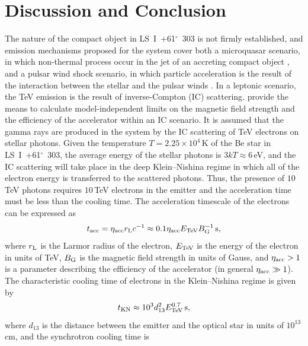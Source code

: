 \documentclass[preprint2]{aastex}
\newcommand{\tapp}{\raisebox{0.5ex}{\texttildelow}}
\newcommand{\lsi}{LS~I~+61$^{\circ}$~303}
\newcommand{\tev}{\,TeV}
\begin{document}
\section{Discussion and Conclusion}
The nature of the compact object in \lsi{} is not firmly established, and emission mechanisms proposed for the system cover both a microquasar scenario, in which non-thermal process occur in the jet of an accreting compact object \citep{Massi2001,Massi2013,2015A&A...575L...9M}, and a pulsar wind shock scenario, in which particle acceleration is the result of the interaction between the stellar and the pulsar winds \citep{Dhawan2006}. In a leptonic scenario, the TeV emission is the result of inverse-Compton (IC) scattering. \citet{2008MNRAS.383..467K} provide the means to calculate model-independent limits on the magnetic field strength and the efficiency of the accelerator within an IC scenario. It is assumed that the gamma rays are produced in the system by the IC scattering of TeV electrons on stellar photons. Given the temperature $T=2.25\times10^4$\,K \citep{2013A&ARv..21...64D} of the Be star in \lsi{}, the average energy of the stellar photons is $3kT \approx 6$\,eV, and the IC scattering will take place in the deep Klein--Nishina regime in which all of the electron energy is transferred to the scattered photons. Thus, the presence of \tapp{}$10$\tev{} photons requires \tapp{}$10$\tev{} electrons in the emitter and the acceleration time must be less than the cooling time. The acceleration timescale of the electrons can be expressed as
\begin{equation}
t_{\mbox{\scriptsize{acc}}} = \eta_{\mbox{\scriptsize{acc}}} r_{\mbox{\scriptsize{L}}} c^{-1} \approx 0.1 \eta_{\mbox{\scriptsize{acc}}} E_{\mbox{\scriptsize{TeV}}} B_{\mbox{\scriptsize{G}}}^{-1} \mbox{\,s},
\label{taccel}
\end{equation}
where $r_{\mbox{\scriptsize{L}}}$ is the Larmor radius of the electron, $E_{\mbox{\scriptsize{TeV}}}$ is the energy of the electron in units of TeV, $B_{\mbox{\scriptsize{G}}}$ is the magnetic field strength in units of Gauss, and $\eta_{\mbox{\scriptsize{acc}}} > 1$ is a parameter describing the efficiency of the accelerator (in general $\eta_{\mbox{\scriptsize{acc}}} \gg 1$). The characteristic cooling time of electrons in the Klein--Nishina regime is given by
\begin{equation}
t_{\mbox{\scriptsize{KN}}} \approx 10^3 d_{13}^2 E_{\mbox{\scriptsize{TeV}}}^{0.7} \mbox{\,s},
\end{equation}
where $d_{13}$ is the distance between the emitter and the optical star in units of $10^{13}$\,cm, and the synchrotron cooling time is 
\end{document}
